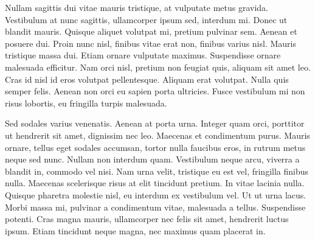 \documentclass{book}
\begin{document}
            Nullam sagittis dui vitae mauris tristique, at vulputate metus gravida. Vestibulum at
               nunc sagittis, ullamcorper ipsum sed, interdum mi. Donec ut blandit mauris. Quisque
               aliquet volutpat mi, pretium pulvinar sem. Aenean et posuere dui. Proin nunc nisl,
               finibus vitae erat non, finibus varius nisl. Mauris tristique massa dui. Etiam ornare
               vulputate maximus. Suspendisse ornare malesuada efficitur. Nam orci nisl, pretium non
               feugiat quis, aliquam sit amet leo. Cras id nisl id eros volutpat pellentesque.
               Aliquam erat volutpat. Nulla quis semper felis. Aenean non orci eu sapien porta
               ultricies. Fusce vestibulum mi non risus lobortis, eu fringilla turpis malesuada.
            
            Sed sodales varius venenatis. Aenean at porta urna. Integer quam orci, porttitor ut
               hendrerit sit amet, dignissim nec leo. Maecenas et condimentum purus. Mauris ornare,
               tellus eget sodales accumsan, tortor nulla faucibus eros, in rutrum metus neque sed
               nunc. Nullam non interdum quam. Vestibulum neque arcu, viverra a blandit in, commodo
               vel nisi. Nam urna velit, tristique eu est vel, fringilla finibus nulla. Maecenas
               scelerisque risus at elit tincidunt pretium. In vitae lacinia nulla. Quisque pharetra
               molestie nisl, eu interdum ex vestibulum vel. Ut ut urna lacus. Morbi massa mi,
               pulvinar a condimentum vitae, malesuada a tellus. Suspendisse potenti. Cras magna
               mauris, ullamcorper nec felis sit amet, hendrerit luctus ipsum. Etiam tincidunt neque
               magna, nec maximus quam placerat in.
         
      
   
\end{document}
